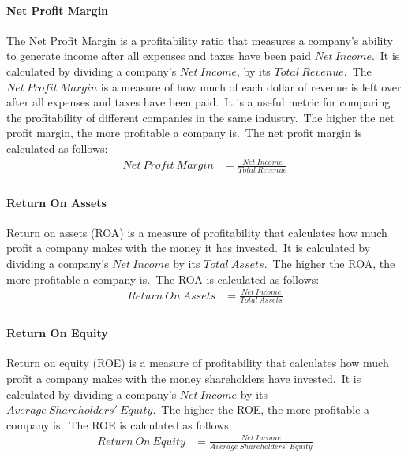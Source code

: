 \documentclass[../xlapes02]{subfiles}
\begin{document}
    \paragraph{Net Profit Margin}\label{par:net-profit-margin}
    The Net Profit Margin is a profitability ratio that measures a company's ability to generate income after all expenses and taxes have been paid $Net\ Income$.\ It is calculated by dividing a company's $Net\ Income$, by its $Total\ Revenue$.\ The $Net\ Profit\ Margin$ is a measure of how much of each dollar of revenue is left over after all expenses and taxes have been paid.\ It is a useful metric for comparing the profitability of different companies in the same industry.\ The higher the net profit margin, the more profitable a company is.\ The net profit margin is calculated as follows:
    \begin{equation}
        \label{eq:net-profit-margin}
        \begin{split}
            Net\ Profit\ Margin&=\frac{Net\ Income}{Total\ Revenue}\\
        \end{split}
    \end{equation}

    \paragraph{Return On Assets}\label{par:return-on-assets}
    Return on assets (ROA) is a measure of profitability that calculates how much profit a company makes with the money it has invested.\ It is calculated by dividing a company's $Net\ Income$ by its $Total\ Assets$.\ The higher the ROA, the more profitable a company is.\ The ROA is calculated as follows:
    \begin{equation}
        \label{eq:return-on-assets}
        \begin{split}
            Return\ On\ Assets&=\frac{Net\ Income}{Total\ Assets}\\
        \end{split}
    \end{equation}

    \paragraph{Return On Equity}\label{par:return-on-equity}
    Return on equity (ROE) is a measure of profitability that calculates how much profit a company makes with the money shareholders have invested.\ It is calculated by dividing a company's $Net\ Income$ by its $Average\ Shareholders'\ Equity$.\ The higher the ROE, the more profitable a company is.\ The ROE is calculated as follows:
    \begin{equation}
        \label{eq:return-on-equity}
        \begin{split}
            Return\ On\ Equity&=\frac{Net\ Income}{Average\ Shareholders'\ Equity}\\
        \end{split}
    \end{equation}
\end{document}
